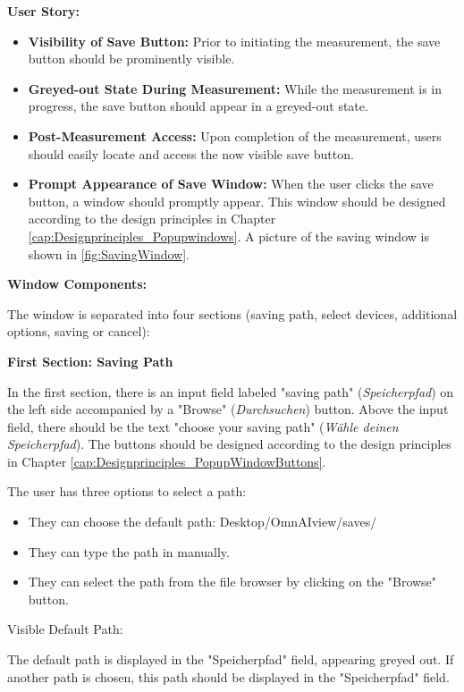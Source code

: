 \documentclass[]{scrreprt}
\begin{document}
\textbf{User Story:}

\begin{itemize}
    \item \textbf{Visibility of Save Button:} Prior to initiating the measurement, the save button should be prominently visible.
    \item \textbf{Greyed-out State During Measurement:} While the measurement is in progress, the save button should appear in a greyed-out state.
    \item \textbf{Post-Measurement Access:} Upon completion of the measurement, users should easily locate and access the now visible save button.
    \item \textbf{Prompt Appearance of Save Window:} When the user clicks the save button, a window should promptly appear. This window should be designed according to the design principles in Chapter \ref{cap:Designprinciples_Popupwindows}. A picture of the saving window is shown in \ref{fig:SavingWindow}.
\end{itemize}

\textbf{Window Components:}

The window is separated into four sections (saving path, select devices, additional options, saving or cancel):

\textbf{First Section: Saving Path}

In the first section, there is an input field labeled "saving path" (\textit{Speicherpfad}) on the left side accompanied by a "Browse" (\textit{Durchsuchen}) button. Above the input field, there should be the text "choose your saving path" (\textit{Wähle deinen Speicherpfad}). The buttons should be designed according to the design principles in Chapter \ref{cap:Designprinciples_PopupWindowButtons}.

The user has three options to select a path:
\begin{itemize}
    \item They can choose the default path: Desktop/OmnAIview/saves/
    \item They can type the path in manually.
    \item They can select the path from the file browser by clicking on the "Browse" button.
\end{itemize}

Visible Default Path:

The default path is displayed in the "Speicherpfad" field, appearing greyed out. If another path is chosen, this path should be displayed in the "Speicherpfad" field.
\end{document}
